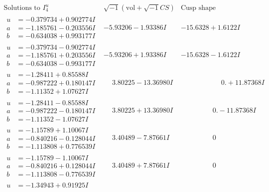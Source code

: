 \documentclass[1p]{elsarticle_modified}
\theoremstyle{definition}
\newcommand{\I}{\sqrt{-1}}
\begin{document}
$$\begin{array}{c|c|c}  
\text{Solutions to }I^u_{4}& \I (\text{vol} + \sqrt{-1}CS) & \text{Cusp shape}\\
 \hline 
\begin{aligned}
u &= -0.379734 + 0.902774 I \\
a &= -1.185761 - 0.203556 I \\
b &= -0.634038 + 0.993177 I\end{aligned}
 & -5.93206 - 1.93386 I & -15.6328 + 1.6122 I \\ \hline\begin{aligned}
u &= -0.379734 - 0.902774 I \\
a &= -1.185761 + 0.203556 I \\
b &= -0.634038 - 0.993177 I\end{aligned}
 & -5.93206 + 1.93386 I & -15.6328 - 1.6122 I \\ \hline\begin{aligned}
u &= -1.28411 + 0.85588 I \\
a &= -0.987222 + 0.180147 I \\
b &= -1.11352 + 1.07627 I\end{aligned}
 & \phantom{-}3.80225 - 13.36980 I & \phantom{-0.000000 -}0. + 11.87368 I \\ \hline\begin{aligned}
u &= -1.28411 - 0.85588 I \\
a &= -0.987222 - 0.180147 I \\
b &= -1.11352 - 1.07627 I\end{aligned}
 & \phantom{-}3.80225 + 13.36980 I & \phantom{-0.000000 } 0. - 11.87368 I \\ \hline\begin{aligned}
u &= -1.15789 + 1.10067 I \\
a &= -0.840216 - 0.128044 I \\
b &= -1.113808 + 0.776539 I\end{aligned}
 & \phantom{-}3.40489 - 7.87661 I & \phantom{-0.000000 } 0 \\ \hline\begin{aligned}
u &= -1.15789 - 1.10067 I \\
a &= -0.840216 + 0.128044 I \\
b &= -1.113808 - 0.776539 I\end{aligned}
 & \phantom{-}3.40489 + 7.87661 I & \phantom{-0.000000 } 0 \\ \hline\begin{aligned}
u &= -1.34943 + 0.91925 I \\

\end{aligned}
\end{array}$$
\end{document}
